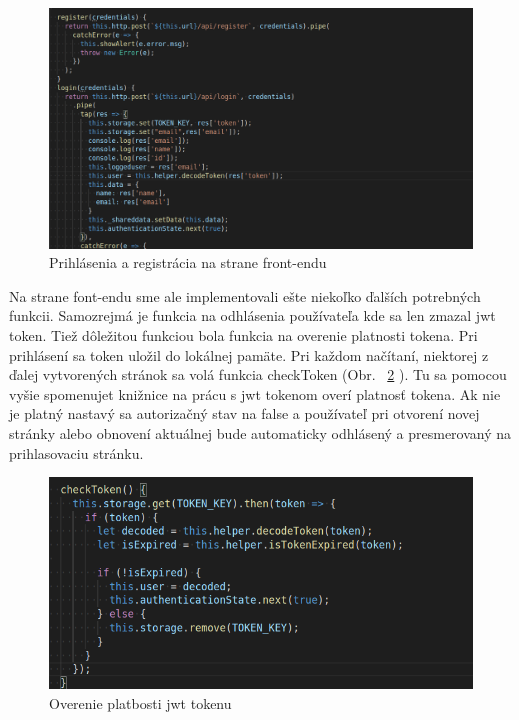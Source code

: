 \begin{figure}[H]
    \centering
    \includegraphics[scale=0.40]{img/imp/login_front.png}
    \caption{Prihlásenia a registrácia na strane front-endu}
    \label{fig:login_front}
\end{figure}

\indent Na strane font-endu sme ale implementovali ešte niekoľko ďalších potrebných funkcii. Samozrejmá je funkcia na odhlásenia používateľa kde sa len zmazal jwt token. Tiež dôležitou funkciou bola funkcia na overenie platnosti tokena. Pri prihlásení sa token uložil do lokálnej pamäte. Pri každom načítaní, niektorej z ďalej vytvorených stránok sa volá funkcia checkToken (Obr. ~\ref{fig:checkjwt} ). Tu sa pomocou vyšie spomenujet knižnice na prácu s jwt tokenom overí platnosť tokena. Ak nie je platný nastavý sa autorizačný stav na false a používateľ pri otvorení novej stránky alebo obnovení aktuálnej bude automaticky odhlásený a presmerovaný na prihlasovaciu stránku. 

\begin{figure}[H]
    \centering
    \includegraphics[scale=0.50]{img/imp/checkjwt.png}
    \caption{Overenie platbosti jwt tokenu}
    \label{fig:checkjwt}
\end{figure}

